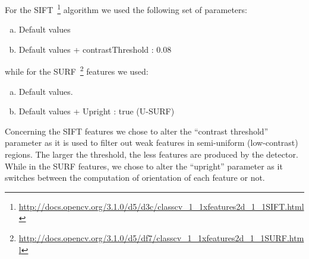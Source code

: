 For the SIFT~\footnote{\url{http://docs.opencv.org/3.1.0/d5/d3c/classcv_1_1xfeatures2d_1_1SIFT.html}}  algorithm we used the following set of parameters:

\begin{enumerate}[(a)]
 \item Default values
 \item Default values + contrastThreshold : 0.08
\end{enumerate}

while for the SURF~\footnote{\url{http://docs.opencv.org/3.1.0/d5/df7/classcv_1_1xfeatures2d_1_1SURF.html}} features we used:
\begin{enumerate}[(a)]
 \item Default values.
 \item Default values + Upright : true (U-SURF)
\end{enumerate}
Concerning the SIFT features we chose to alter the ``contrast threshold'' parameter as it is used to filter out weak features in semi-uniform (low-contrast) regions. The larger the threshold, the less features are produced by the detector. 
While in the SURF features, we chose to alter the ``upright'' parameter as it switches between the computation of orientation of each feature or not.

